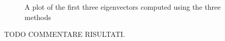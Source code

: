 \begin{figure}[H]
    \caption{A plot of the first three eigenvectors computed using the three methods}
    \label{Eigenvectors_comp_norm}
\end{figure}

TODO COMMENTARE RISULTATI.